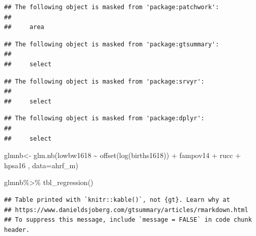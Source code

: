 \documentclass[
]{article}
\newenvironment{Shaded}{\begin{snugshade}}{\end{snugshade}}
\newcommand{\AttributeTok}[1]{\textcolor[rgb]{0.77,0.63,0.00}{#1}}
\newcommand{\FunctionTok}[1]{\textcolor[rgb]{0.00,0.00,0.00}{#1}}
\newcommand{\NormalTok}[1]{#1}
\newcommand{\OtherTok}[1]{\textcolor[rgb]{0.56,0.35,0.01}{#1}}
\newcommand{\SpecialCharTok}[1]{\textcolor[rgb]{0.00,0.00,0.00}{#1}}
\begin{document}
\begin{verbatim}
## The following object is masked from 'package:patchwork':
## 
##     area
\end{verbatim}

\begin{verbatim}
## The following object is masked from 'package:gtsummary':
## 
##     select
\end{verbatim}

\begin{verbatim}
## The following object is masked from 'package:srvyr':
## 
##     select
\end{verbatim}

\begin{verbatim}
## The following object is masked from 'package:dplyr':
## 
##     select
\end{verbatim}

\begin{Shaded}
\begin{Highlighting}[]
\NormalTok{glmnb}\OtherTok{\textless{}{-}} \FunctionTok{glm.nb}\NormalTok{(lowbw1618 }\SpecialCharTok{\textasciitilde{}} \FunctionTok{offset}\NormalTok{(}\FunctionTok{log}\NormalTok{(births1618)) }\SpecialCharTok{+}\NormalTok{ fampov14 }\SpecialCharTok{+}\NormalTok{ rucc }\SpecialCharTok{+}\NormalTok{ hpsa16 ,}
               \AttributeTok{data=}\NormalTok{ahrf\_m)}


\NormalTok{glmnb}\SpecialCharTok{\%\textgreater{}\%}
  \FunctionTok{tbl\_regression}\NormalTok{()}
\end{Highlighting}
\end{Shaded}

\begin{verbatim}
## Table printed with `knitr::kable()`, not {gt}. Learn why at
## https://www.danieldsjoberg.com/gtsummary/articles/rmarkdown.html
## To suppress this message, include `message = FALSE` in code chunk header.
\end{verbatim}
\end{document}
